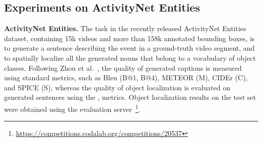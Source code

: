 \documentclass[runningheads]{llncs}
\begin{document}
\subsection{Experiments on ActivityNet Entities}
\textbf{ActivityNet Entities.} The task in the recently released ActivityNet Entities~\cite{Zhou:CVPR19} dataset, containing 15k videos and more than 158k annotated bounding boxes, is to generate a sentence describing the event in a ground-truth video segment, and to spatially localize all the generated nouns that belong to a vocabulary of  object classes. Following Zhou et al.~\cite{Zhou:CVPR19}, the quality of generated captions is measured using standard metrics, such as Bleu (B@1, B@4), METEOR (M), CIDEr (C), and SPICE (S), whereas the quality of object localization is evaluated on generated sentences using the ,   metrics. Object localization results on the test set were obtained using the evaluation server~\footnote{\url{https://competitions.codalab.org/competitions/20537}}.
\label{subsec:activitynet}
\begin{table}[t]
\caption{\textbf{Grounded video description results on ActivityNet Entities~\cite{Zhou:CVPR19}}. MHA: multi-head self-attention. SCM-VG: our semantic context module with visual-to-symbolic node correspondences pre-trained on Visual Genome.}
\centering
{}
\label{tab:activitynet}
\end{table}
\end{document}
